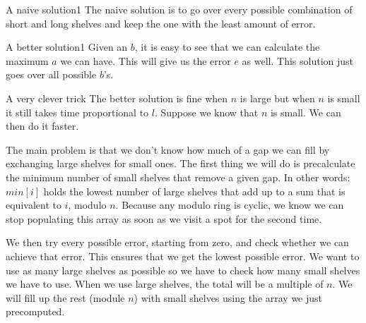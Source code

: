 \documentclass{writeup}
\begin{document}
\begin{solutions}
  \begin{solution}{A naive solution}{}{1}
    The naive solution is to go over every possible combination of short and long shelves and keep the one with the least amount of error.
  \end{solution}

  \begin{solution}{A better solution}{}{1}
    Given an $b$, it is easy to see that we can calculate the maximum $a$ we can have.
    This will give us the error $e$ as well.
    This solution just goes over all possible $b$'s.
  \end{solution}

  \begin{solution}{A very clever trick}{}{}
    The better solution is fine when $n$ is large but when $n$ is small it still takes time proportional to $l$.
    Suppose we know that $n$ is small.
    We can then do it faster.

    The main problem is that we don't know how much of a gap we can fill by exchanging large shelves for small ones.
    The first thing we will do is precalculate the minimum number of small shelves that remove a given gap.
    In other words: $min[i]$ holds the lowest number of large shelves that add up to a sum that is equivalent to $i$, modulo $n$.
    Because any modulo ring is cyclic, we know we can stop populating this array as soon as we visit a spot for the second time.

    We then try every possible error, starting from zero, and check whether we can achieve that error.
    This ensures that we get the lowest possible error.
    We want to use as many large shelves as possible so we have to check how many small shelves we have to use.
    When we use large shelves, the total will be a multiple of $n$.
    We will fill up the rest (module $n$) with small shelves using the array we just precomputed.
  \end{solution}
\end{solutions}
\end{document}
